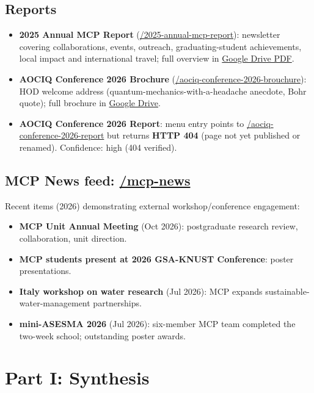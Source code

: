 \documentclass[11pt,a4paper]{article}
\begin{document}
\subsection{Reports}
\begin{itemize}[leftmargin=1.4em]
  \item \textbf{2025 Annual MCP Report} (\href{https://physics.knust.edu.gh/2025-annual-mcp-report}{/2025-annual-mcp-report}): newsletter covering collaborations, events, outreach, graduating-student achievements, local impact and international travel; full overview in \href{https://drive.google.com/file/d/1aHH-dEEte0grV01N-OY1_JNuJjBlSHSP/view}{Google Drive PDF}.
  \item \textbf{AOCIQ Conference 2026 Brochure} (\href{https://physics.knust.edu.gh/aociq-conference-2026-brouchure}{/aociq-conference-2026-brouchure}): HOD welcome address (quantum-mechanics-with-a-headache anecdote, Bohr quote); full brochure in \href{https://drive.google.com/file/d/1gyGKrk-vHol-xpqCaSpe0R4Ij3YI4gYe/view}{Google Drive}.
  \item \textbf{AOCIQ Conference 2026 Report}: menu entry points to \href{https://physics.knust.edu.gh/aociq-conference-2026-report}{/aociq-conference-2026-report} but returns \textbf{HTTP 404} (page not yet published or renamed). Confidence: high (404 verified).
\end{itemize}

\subsection{MCP News feed: \href{https://physics.knust.edu.gh/mcp-news}{/mcp-news}}
Recent items (2026) demonstrating external workshop/conference engagement:
\begin{itemize}[leftmargin=1.4em]
  \item \textbf{MCP Unit Annual Meeting} (Oct 2026): postgraduate research review, collaboration, unit direction.
  \item \textbf{MCP students present at 2026 GSA-KNUST Conference}: poster presentations.
  \item \textbf{Italy workshop on water research} (Jul 2026): MCP expands sustainable-water-management partnerships.
  \item \textbf{mini-ASESMA 2026} (Jul 2026): six-member MCP team completed the two-week school; outstanding poster awards.
\end{itemize}

\section{Part I: Synthesis}
\end{document}
